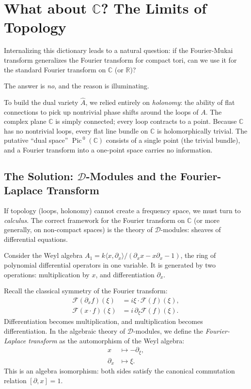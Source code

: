 \documentclass{article}
\newcommand{\C}{{\mathbb{C}}}
\newcommand{\R}{{\mathbb{R}}}
\newcommand{\CD}{{\mathcal{D}}}
\newcommand{\CF}{{\mathcal{F}}}
\newcommand{\Pic}{{\operatorname{Pic}\,}}
\begin{document}
\section{What about $\C$? The Limits of Topology}

Internalizing this dictionary leads to a natural question: if the Fourier-Mukai transform generalizes the Fourier transform for compact tori, can we use it for the standard Fourier transform on $\C$ (or $\R$)?

The answer is \emph{no}, and the reason is illuminating.

To build the dual variety $\hat{A}$, we relied entirely on \emph{holonomy}: the ability of flat connections to pick up nontrivial phase shifts around the loops of $A$. The complex plane $\C$ is simply connected; every loop contracts to a point. Because $\C$ has no nontrivial loops, every flat line bundle on $\C$ is holomorphically trivial. The putative ``dual space'' $\Pic^0(\C)$ consists of a single point (the trivial bundle), and a Fourier transform into a one-point space carries no information.

\subsection{The Solution: $\CD$-Modules and the Fourier-Laplace Transform}

If topology (loops, holonomy) cannot create a frequency space, we must turn to \emph{calculus}. The correct framework for the Fourier transform on $\C$ (or more generally, on non-compact spaces) is the theory of $\CD$-modules: sheaves of differential equations.

Consider the Weyl algebra $A_1 = k\langle x, \partial_x \rangle / (\partial_x x - x \partial_x - 1)$, the ring of polynomial differential operators in one variable. It is generated by two operations: multiplication by $x$, and differentiation $\partial_x$.

Recall the classical symmetry of the Fourier transform:
\begin{align*}
    \CF(\partial_x f)(\xi) &= i\xi \cdot \CF(f)(\xi), \\
    \CF(x \cdot f)(\xi) &= i\, \partial_\xi \CF(f)(\xi).
\end{align*}
Differentiation becomes multiplication, and multiplication becomes differentiation. In the algebraic theory of $\CD$-modules, we define the \emph{Fourier-Laplace transform} as the automorphism of the Weyl algebra:
\begin{align*}
    x &\longmapsto -\partial_\xi, \\
    \partial_x &\longmapsto \xi.
\end{align*}
This is an algebra isomorphism: both sides satisfy the canonical commutation relation $[\partial, x] = 1$.
\end{document}
